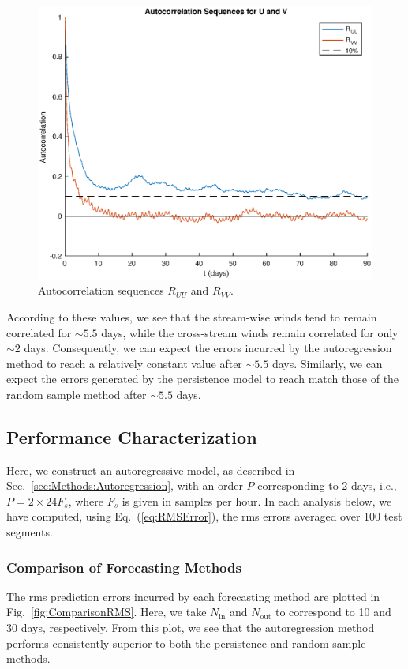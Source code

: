 \documentclass[11pt, oneside]{article}
\newcommand{\figref}[1]{Fig.~\ref{#1}}
\newcommand{\eqnref}[1]{Eq.~(\ref{#1})}
\newcommand{\secref}[1]{Sec.~\ref{#1}}
\begin{document}
\begin{figure}[htb]
\centering
\includegraphics[width=\columnwidth]{figures/AutocorrelationSequences_90days}
\caption{Autocorrelation sequences $R_{UU}$ and $R_{VV}$.}
\label{fig:Autocorrelations}
\end{figure}

According to these values, we see that the stream-wise winds tend to remain correlated for $\sim 5.5$ days, while the cross-stream winds remain correlated for only $\sim 2$ days.
Consequently, we can expect the errors incurred by the autoregression method to reach a relatively constant value after $\sim 5.5$ days.
Similarly, we can expect the errors generated by the persistence model to reach match those of the random sample method after $\sim 5.5$ days.

\subsection{Performance Characterization}
Here, we construct an autoregressive model, as described in \secref{sec:Methods:Autoregression}, with an order $P$ corresponding to 2 days, i.e., $P = 2 \times 24 F_s$, where $F_s$ is given in samples per hour.
In each analysis below, we have computed, using \eqnref{eq:RMSError}, the rms errors averaged over 100 test segments.

\subsubsection{Comparison of Forecasting Methods}
The rms prediction errors incurred by each forecasting method are plotted in \figref{fig:ComparisonRMS}.
Here, we take $N_\text{in}$ and $N_\text{out}$ to correspond to 10 and 30 days, respectively. %
From this plot, we see that the autoregression method performs consistently superior to both the persistence and random sample methods.
\end{document}
